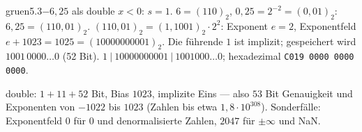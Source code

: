 \begin{loesungkarte}{gruen}{5.3}{$-6{,}25$ als double}
$x < 0$: $s = 1$.
$6 = (110)_2$, $0{,}25 = 2^{-2} = (0{,}01)_2$: $6{,}25 = (110{,}01)_2$.
$(110{,}01)_2 = (1{,}1001)_2\cdot2^{2}$: Exponent $e = 2$, Exponentfeld $e + 1023 = 1025 = (10000000001)_2$.
Die führende $1$ ist implizit; gespeichert wird $1001\,0000\dots0$ (52 Bit).
$1\ |\ 10000000001\ |\ 1001000\dots0$; hexadezimal \texttt{C019 0000 0000 0000}.
\begin{mitnehmen}\kastentext
double: $1 + 11 + 52$ Bit, Bias $1023$, implizite Eins --- also $53$ Bit Genauigkeit und Exponenten von $-1022$ bis $1023$ (Zahlen bis etwa $1{,}8\cdot10^{308}$). Sonderfälle: Exponentfeld $0$ für $0$ und denormalisierte Zahlen, $2047$ für $\pm\infty$ und NaN.
\end{mitnehmen}
\end{loesungkarte}

